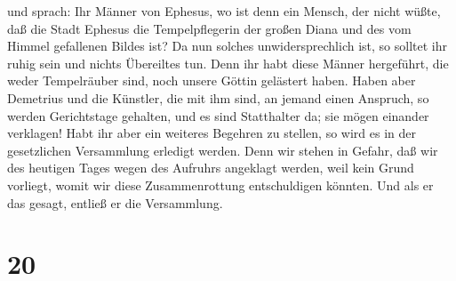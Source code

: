 und sprach: Ihr Männer von Ephesus, wo ist denn ein Mensch, der nicht
wüßte, daß die Stadt Ephesus die Tempelpflegerin der großen Diana und
des vom Himmel gefallenen Bildes ist?  Da nun solches
unwidersprechlich ist, so solltet ihr ruhig sein und nichts Übereiltes
tun.  Denn ihr habt diese Männer hergeführt, die weder
Tempelräuber sind, noch unsere Göttin gelästert haben. 
Haben aber Demetrius und die Künstler, die mit ihm sind, an jemand einen
Anspruch, so werden Gerichtstage gehalten, und es sind Statthalter da;
sie mögen einander verklagen!  Habt ihr aber ein weiteres
Begehren zu stellen, so wird es in der gesetzlichen Versammlung erledigt
werden.  Denn wir stehen in Gefahr, daß wir des heutigen
Tages wegen des Aufruhrs angeklagt werden, weil kein Grund vorliegt,
womit wir diese Zusammenrottung entschuldigen könnten. 
Und als er das gesagt, entließ er die Versammlung.

\hypertarget{section-19}{%
\section{20}\label{section-19}}

